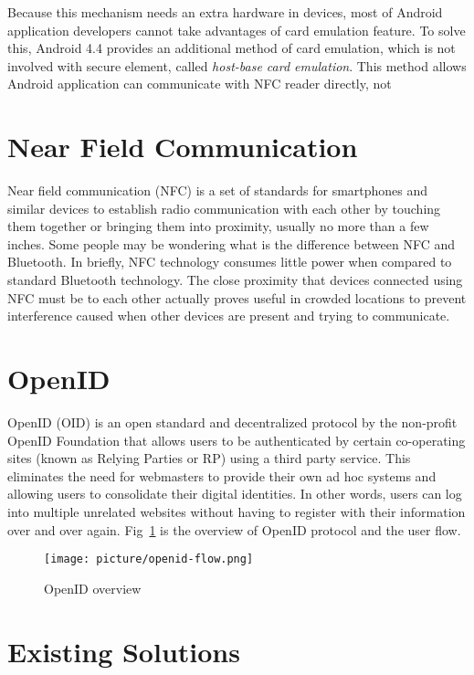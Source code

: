 \begin{CJK}{Bg5}{bsmi}
Because this mechanism needs an extra hardware in devices, most of Android application developers cannot take advantages of card emulation feature. To solve this, Android 4.4 provides an additional method of card emulation, which is not involved with secure element, called \emph{host-base card emulation}. This method allows Android application can communicate with NFC reader directly, not 

\section{Near Field Communication}

Near field communication (NFC)\cite{nfc-wiki} is a set of standards for smartphones and similar devices to establish radio communication with each other by touching them together or bringing them into proximity, usually no more than a few inches. Some people may be wondering what is the difference between NFC and Bluetooth. In briefly, NFC technology consumes little power when compared to standard Bluetooth technology\cite{nfc-ble-1}\cite{nfc-ble-2}. The close proximity that devices connected using NFC must be to each other actually proves useful in crowded locations to prevent interference caused when other devices are present and trying to communicate. 

\section{OpenID}

OpenID (OID)\cite{openid} is an open standard and decentralized protocol by the non-profit OpenID Foundation that allows users to be authenticated by certain co-operating sites (known as Relying Parties or RP) using a third party service. This eliminates the need for webmasters to provide their own ad hoc systems and allowing users to consolidate their digital identities. In other words, users can log into multiple unrelated websites without having to register with their information over and over again. Fig~\ref{fig:openid-flow} is the overview of OpenID protocol and the user flow.
\begin{figure}
\centering
\texttt{[image: picture/openid-flow.png]}
\caption{OpenID overview\cite{openid-flow}}
\label{fig:openid-flow}
\end{figure}

\section{Existing Solutions}


\end{CJK}
